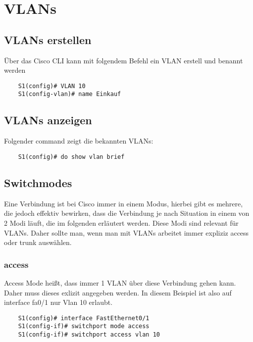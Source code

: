 \documentclass[asp2.tex]{subfiles}
\begin{document}
\section{VLANs}

\subsection{VLANs erstellen}

Über das Cisco CLI kann mit folgendem Befehl ein VLAN erstell und benannt werden

\begin{lstlisting}
    S1(config)# VLAN 10
    S1(config-vlan)# name Einkauf
\end{lstlisting}

\subsection{VLANs anzeigen}

Folgender command zeigt die bekannten VLANs:

\begin{lstlisting}
    S1(config)# do show vlan brief
\end{lstlisting}

\subsection{Switchmodes}

Eine Verbindung ist bei Cisco immer in einem Modus, hierbei gibt es mehrere, 
die jedoch effektiv bewirken, dass die Verbindung je nach Situation in 
einem von 2 Modi läuft, die im folgenden erläutert werden.
Diese Modi sind relevant für VLANs. 
Daher sollte man, wenn man mit VLANs arbeitet immer expliziz access oder trunk auswählen.

\subsubsection{access}

Access Mode heißt, dass immer 1 VLAN über diese Verbindung gehen kann. Daher muss dieses exlizit angegeben werden.
In diesem Beispiel ist also auf interface fa0/1 nur Vlan 10 erlaubt.

\begin{lstlisting}
    S1(config)# interface FastEthernet0/1
    S1(config-if)# switchport mode access
    S1(config-if)# switchport access vlan 10
\end{lstlisting}
\end{document}

